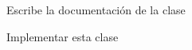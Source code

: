 
\begin{DoxyRefList}
\item[\label{todo__todo000001}%
\hypertarget{todo__todo000001}{}%
Clase \hyperlink{classfecha}{fecha} ]Escribe la documentación de la clase 

Implementar esta clase
\end{DoxyRefList}
